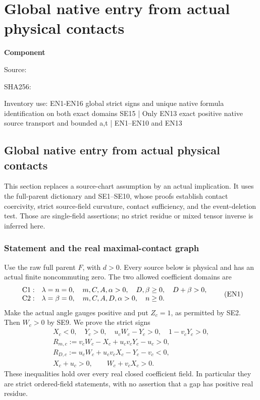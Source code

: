 \chapter{Global native entry from actual physical contacts}
\label{component:paf13bbf8fd32}
\noindent\textbf{Component }\par
{\small\noindent Source: \par}
{\small\noindent SHA256: \par}
{\small\noindent Inventory use: EN1-EN16 global strict signs and unique native formula identification on both exact domains SE15 | Only EN13 exact positive native source transport and bounded a,t | EN1–EN10 and EN13\par}
\medskip
\section{Global native entry from actual physical contacts}
\label{paf13bbf8fd32:sec:global-native-entry-rederived}

This section replaces a source-chart assumption by an actual implication.
It uses the full-parent dictionary and SE1--SE10, whose proofs establish
contact coercivity, strict source-field curvature, contact sufficiency,
and the event-deletion test.  Those are single-field assertions; no
strict residue or mixed tensor inverse is inferred here.

\subsection{Statement and the real maximal-contact graph}

Use the raw full parent \(F\), with \(d>0\).
Every source below is physical and has an actual finite noncommuting
zero.  The two allowed coefficient domains are
\[
\begin{array}{ll}
 {\rm C1}:&\lambda=n=0,\quad m,C,A,\alpha>0,\quad
 D,\beta\ge0,\quad D+\beta>0,\\
 {\rm C2}:&\lambda=\beta=0,\quad m,C,A,D,\alpha>0,\quad n\ge0.
\end{array}\tag{EN1}
\]
Make the actual angle gauges positive and put \(Z_c=1\), as permitted
by SE2.  Then \(W_c>0\) by SE9.  We prove the strict signs
\[
\begin{gathered}
 X_c<0,\quad Y_c>0,\quad u_cW_c-Y_c>0,\quad
 1-v_cY_c>0,\\
 R_{m,c}:=v_cW_c-X_c+u_cv_cY_c-u_c>0,\\
 R_{D,c}:=u_cW_c+u_cv_cX_c-Y_c-v_c<0,\\
 X_c+u_c>0,\qquad W_c+v_cX_c>0.
\end{gathered}\tag{EN2}
\]
These inequalities hold over every real closed coefficient field.
In particular they are strict ordered-field statements, with no
assertion that a gap has positive real residue.

